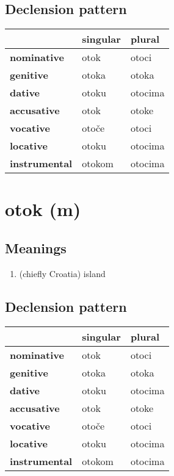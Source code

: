 \subsection*{Declension pattern}
\begin{tabularx}{\linewidth}{Xll}
\toprule
{} & singular &   plural \\
\midrule
\textbf{nominative  } &     otok &    otoci \\
\textbf{genitive    } &    otoka &    otoka \\
\textbf{dative      } &    otoku &  otocima \\
\textbf{accusative  } &     otok &    otoke \\
\textbf{vocative    } &    otoče &    otoci \\
\textbf{locative    } &    otoku &  otocima \\
\textbf{instrumental} &   otokom &  otocima \\
\bottomrule
\end{tabularx}

\filbreak
\section{otok (m)}
\subsection*{Meanings}
\begin{enumerate}
\item (chiefly Croatia) island
\end{enumerate}
\subsection*{Declension pattern}
\begin{tabularx}{\linewidth}{Xll}
\toprule
{} & singular &   plural \\
\midrule
\textbf{nominative  } &     otok &    otoci \\
\textbf{genitive    } &    otoka &    otoka \\
\textbf{dative      } &    otoku &  otocima \\
\textbf{accusative  } &     otok &    otoke \\
\textbf{vocative    } &    otoče &    otoci \\
\textbf{locative    } &    otoku &  otocima \\
\textbf{instrumental} &   otokom &  otocima \\
\bottomrule
\end{tabularx}


